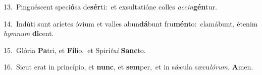 {\numbfont\textcolor{\numbcolor}{13.}}~Pinguéscent speci\-\textbf{ó}\-sa de\-\textbf{sér}\-ti:~\star et exsultatióne colles \textit{ac}\-\textit{cin}\textbf{gén}tur.\par
{\numbfont\textcolor{\numbcolor}{14.}}~Indúti sunt aríetes óvium et valles abun\-\textbf{dá}\-bunt fru\-\textbf{mén}\-to:~\star clamábunt, étenim \textit{hym}\-\textit{num} \textbf{di}\-cent.\par
{\numbfont\textcolor{\numbcolor}{15.}}~Glória \textbf{Pa}\-tri, et \textbf{Fí}\-lio,~\star et Spirí\-\textit{tu}\-\textit{i} \textbf{Sanc}\-to.\par
{\numbfont\textcolor{\numbcolor}{16.}}~Sicut erat in princípio, et \textbf{nunc}\-, et \textbf{sem}\-per,~\star et in sǽcula sæcu\-\textit{ló}\-\textit{rum}. \textbf{A}\-men.\par
